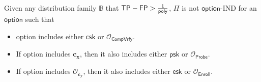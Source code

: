 \begin{theorem}
\label{thm:ind-tp-fp}
Given any distribution family $\mathbb{B}$ that $\textsf{TP} - \textsf{FP} > \frac{1}{\mathsf{poly}}$, $\Pi$ is not $\textsf{option}$-IND for an $\textsf{option}$ such that

\begin{itemize}
	\item \textsf{option} includes either $\textsf{csk}$ or $\mathcal{O}_{\textsf{CompVrfy}}$.

	\item If \textsf{option} includes $\mathbf{c_x}$, then it also includes either $\textsf{psk}$ or $\mathcal{O}_{\textsf{Probe}}$.

	\item If \textsf{option} includes $\mathcal{O}_{\mathbf{c_y}}$, then it also includes either $\textsf{esk}$ or $\mathcal{O}_{\textsf{Enroll}}$.
\end{itemize}

\end{theorem}

